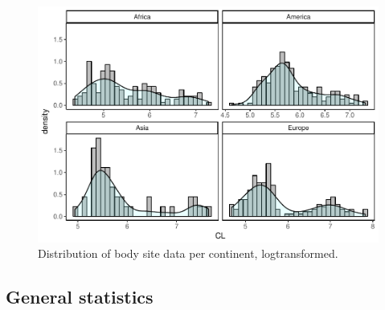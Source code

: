 \documentclass[]{article}
\begin{document}
\begin{figure}[htbp]
\centering
\includegraphics{MA_JJ_files/figure-latex/Histograms of body size data, split by continents-1.pdf}
\caption{Distribution of body site data per continent, logtransformed.}
\end{figure}

\newpage

\subsection{General statistics}\label{general-statistics}
\end{document}
